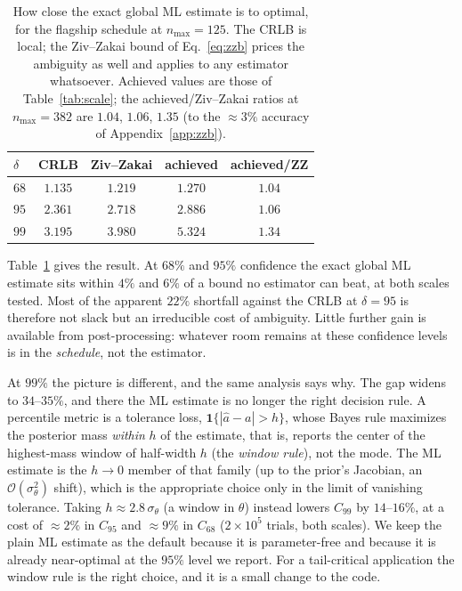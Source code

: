 \documentclass[%
 twocolumn,
 amsmath,amssymb,
prx,
longbibliography
]{revtex4-2}
\begin{document}
\begin{table}[t]
\caption{\label{tab:zzb}How close the exact global \ac{ML} estimate is to optimal, for the flagship schedule at $n_{\max}=125$. The \ac{CRLB} is local; the Ziv--Zakai bound of Eq.~\eqref{eq:zzb} prices the ambiguity as well and applies to any estimator whatsoever. Achieved values are those of Table~\ref{tab:scale}; the achieved/Ziv--Zakai ratios at $n_{\max}=382$ are $1.04$, $1.06$, $1.35$ (to the $\approx 3\%$ accuracy of Appendix~\ref{app:zzb}).}
\begin{ruledtabular}
\begin{tabular}{lcccc}
$\delta$ & \ac{CRLB} & Ziv--Zakai & achieved & achieved/ZZ \\
\hline
$68$ & $1.135$ & $1.219$ & $1.270$ & $1.04$ \\
$95$ & $2.361$ & $2.718$ & $2.886$ & $1.06$ \\
$99$ & $3.195$ & $3.980$ & $5.324$ & $1.34$ \\
\end{tabular}
\end{ruledtabular}
\end{table}

Table~\ref{tab:zzb} gives the result. At $68\%$ and $95\%$ confidence the exact global \ac{ML} estimate sits within $4\%$ and $6\%$ of a bound no estimator can beat, at both scales tested. Most of the apparent $22\%$ shortfall against the \ac{CRLB} at $\delta = 95$ is therefore not slack but an irreducible cost of ambiguity. Little further gain is available from post-processing: whatever room remains at these confidence levels is in the \emph{schedule}, not the estimator.

At $99\%$ the picture is different, and the same analysis says why. The gap widens to $34$--$35\%$, and there the \ac{ML} estimate is no longer the right decision rule. A percentile metric is a tolerance loss, $\mathbf{1}\{|\hat a - a| > h\}$, whose Bayes rule maximizes the posterior mass \emph{within} $h$ of the estimate, that is, reports the center of the highest-mass window of half-width $h$ (the \emph{window rule}), not the mode. The \ac{ML} estimate is the $h \to 0$ member of that family (up to the prior's Jacobian, an $\mathcal{O}(\sigma_\theta^2)$ shift), which is the appropriate choice only in the limit of vanishing tolerance. Taking $h \approx 2.8\,\sigma_\theta$ (a window in $\theta$) instead lowers $C_{99}$ by $14$--$16\%$, at a cost of $\approx 2\%$ in $C_{95}$ and $\approx 9\%$ in $C_{68}$ ($2\times 10^5$ trials, both scales). We keep the plain \ac{ML} estimate as the default because it is parameter-free and because it is already near-optimal at the $95\%$ level we report. For a tail-critical application the window rule is the right choice, and it is a small change to the code.
\end{document}
